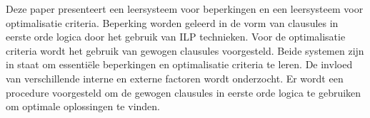 Deze paper presenteert een leersysteem voor beperkingen en een leersysteem voor optimalisatie criteria.
Beperking worden geleerd in de vorm van clausules in eerste orde logica door het gebruik van ILP technieken.
Voor de optimalisatie criteria wordt het gebruik van gewogen clausules voorgesteld.
Beide systemen zijn in staat om essenti\"ele beperkingen en optimalisatie criteria te leren.
De invloed van verschillende interne en externe factoren wordt onderzocht.
Er wordt een procedure voorgesteld om de gewogen clausules in eerste orde logica te gebruiken om optimale oplossingen te vinden.